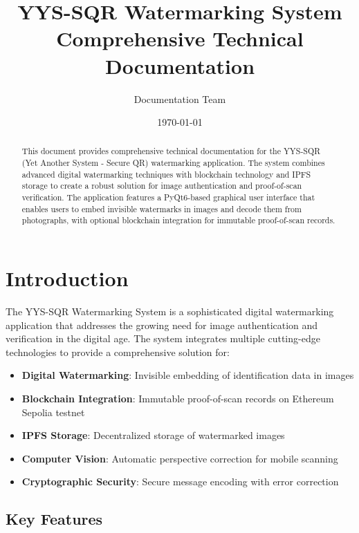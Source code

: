 \documentclass[12pt,a4paper]{article}
\title{\textbf{YYS-SQR Watermarking System}\\
\large{Comprehensive Technical Documentation}}
\author{Documentation Team}
\date{\today}
\begin{document}
\maketitle

\begin{abstract}
This document provides comprehensive technical documentation for the YYS-SQR (Yet Another System - Secure QR) watermarking application. The system combines advanced digital watermarking techniques with blockchain technology and IPFS storage to create a robust solution for image authentication and proof-of-scan verification. The application features a PyQt6-based graphical user interface that enables users to embed invisible watermarks in images and decode them from photographs, with optional blockchain integration for immutable proof-of-scan records.
\end{abstract}

\tableofcontents
\newpage

\section{Introduction}

The YYS-SQR Watermarking System is a sophisticated digital watermarking application that addresses the growing need for image authentication and verification in the digital age. The system integrates multiple cutting-edge technologies to provide a comprehensive solution for:

\begin{itemize}
    \item \textbf{Digital Watermarking}: Invisible embedding of identification data in images
    \item \textbf{Blockchain Integration}: Immutable proof-of-scan records on Ethereum Sepolia testnet
    \item \textbf{IPFS Storage}: Decentralized storage of watermarked images
    \item \textbf{Computer Vision}: Automatic perspective correction for mobile scanning
    \item \textbf{Cryptographic Security}: Secure message encoding with error correction
\end{itemize}

\subsection{Key Features}
\end{document}
